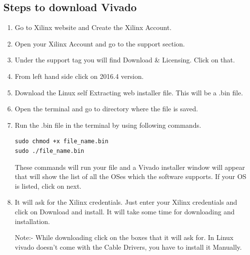 \documentclass[journal,12pt,twocolumn]{IEEEtran}
\begin{document}
\subsection{ Steps to download Vivado}
\begin{enumerate}
\item Go to Xilinx website and Create the Xilinx Account.

\item Open your Xilinx Account and go to the support section.

\item Under the support tag you will find Download \&  Licensing. Click on that.

\item From left hand side click on 2016.4 version.

\item Download the Linux self Extracting web installer file. This will be a .bin file.
\item Open the terminal and go to directory where the file is saved.
\item Run the .bin file in the terminal by using following commands.
\begin{verbatim}
sudo chmod +x file_name.bin
sudo ./file_name.bin   

\end{verbatim}

These commands will run your file and a Vivado installer window will appear that will show the list of all the OSes  which the software supports.  If your OS is listed, click on next.

\item It will ask for the Xilinx credentials. Just enter your Xilinx credentials and click on Download and install. It will take some time for downloading and installation.

Note:- While downloading click on the boxes that it will ask for. In Linux vivado doesn't come with the Cable Drivers, you have to install it Manually.




\end{enumerate}
\end{document}
